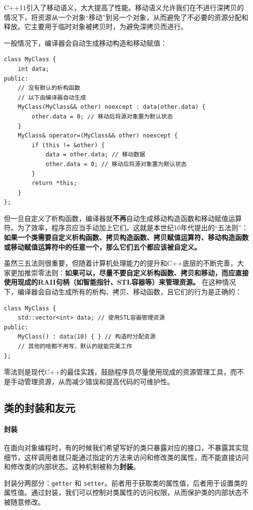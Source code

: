 C++11引入了移动语义，大大提高了性能。移动语义允许我们在不进行深拷贝的情况下，将资源从一个对象“移动”到另一个对象，从而避免了不必要的资源分配和释放。它主要用于临时对象被拷贝时，为避免深拷贝而进行。

一般情况下，编译器会自动生成移动构造和移动赋值：
\begin{verbatim}
class MyClass {
    int data;
public:
    // 没有默认的析构函数
    // 以下由编译器自动生成
    MyClass(MyClass&& other) noexcept : data(other.data) {
        other.data = 0; // 移动后将源对象置为默认状态
    }
    MyClass& operator=(MyClass&& other) noexcept {
        if (this != &other) {
            data = other.data; // 移动数据
            other.data = 0; // 移动后将源对象置为默认状态
        }
        return *this;
    }
};
\end{verbatim}
但一旦自定义了析构函数，编译器就\textbf{不再}自动生成移动构造函数和移动赋值运算符。为了效率，程序员应当手动加上它们。这就是本世纪10年代提出的“五法则”：\textbf{如果一个类需要自定义析构函数、拷贝构造函数、拷贝赋值运算符、移动构造函数或移动赋值运算符中的任意一个，那么它们五个都应该被自定义。}

虽然三五法则很重要，但随着计算机处理能力的提升和C++底层的不断完善，大家更加推崇零法则：\textbf{如果可以，尽量不要自定义析构函数、拷贝和移动，而应直接使用现成的RAII句柄（如智能指针、STL容器等）来管理资源。} 在这种情况下，编译器会自动生成所有的析构、拷贝、移动函数，且它们的行为是正确的：
\begin{verbatim}
class MyClass {
    std::vector<int> data; // 使用STL容器管理资源
public:
    MyClass() : data(10) { } // 构造时分配资源
    // 其他的啥都不用写，默认的就能完美工作
};
\end{verbatim}
零法则是现代C++的最佳实践，鼓励程序员尽量使用现成的资源管理工具，而不是手动管理资源，从而减少错误和提高代码的可维护性。

\subsection{类的封装和友元}

\paragraph{封装}
在面向对象编程时，有的时候我们希望写好的类只暴露对应的接口，不暴露其实现细节，这样调用者就只能通过指定的方法来访问和修改类的属性，而不能直接访问和修改类的内部状态。这种机制被称为\textbf{封装}。

封装分两部分：\verb|getter| 和 \verb|setter|。前者用于获取类的属性值，后者用于设置类的属性值。通过封装，我们可以控制对类属性的访问权限，从而保护类的内部状态不被随意修改。

